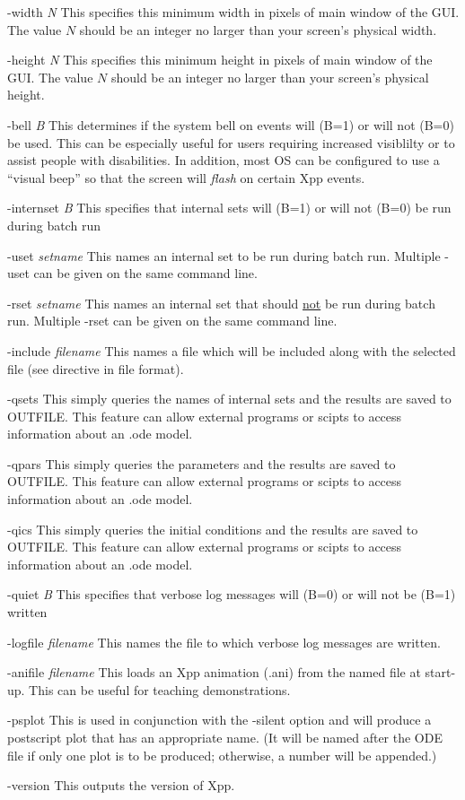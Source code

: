 \begin{description}
\item{-width  \emph{N}} This specifies this minimum width in pixels of main window of the GUI. The value $N$ should be an integer no larger than your screen's physical width.
\item{-height \emph{N}} This specifies this minimum height in pixels of main window of the GUI. The value $N$ should be an integer no larger than your screen's physical height.              
\item{-bell \emph{B}} This determines if the system bell on events will (B=1) or will not (B=0) be used.  This can be especially useful
for users requiring increased visiblilty or to assist people with disabilities.  In addition, most OS can be configured to use a ``visual beep''
so that the screen will \emph{flash} on certain Xpp events. 
\item{-internset \emph{B}} This specifies that internal sets will (B=1) or will not (B=0) be run during batch run
\item{-uset \emph{setname}}  This names an internal set to be run during batch run.  Multiple -uset can be given on the same command line.
\item{-rset \emph{setname}} This names an internal set that should \underline{not} be run during batch run. Multiple -rset can be given on the same command line.
\item{-include \emph{filename}} This names a file which will be included along with the selected {} file (see {} directive in {} file format).
\item{-qsets} This simply queries the names of internal sets and the results are saved to OUTFILE.  This feature can allow 
external programs or scipts to access information about an .ode model. 
\item{-qpars} This simply queries the  parameters and the results are saved to OUTFILE.  This feature can allow 
external programs or scipts to access information about an .ode model.
\item{-qics} This simply queries the initial conditions and the results are saved to OUTFILE.  This feature can allow 
external programs or scipts to access information about an .ode model.          
 \item{-quiet \emph{B}}  This specifies that verbose log messages will (B=0) or will not be (B=1) written
\item{-logfile \emph{filename}} This names the file to which verbose log messages are written. 
\item{-anifile \emph{filename}} This loads an Xpp animation (.ani) from the named file at start-up.  This can be useful for
teaching demonstrations.
\item{-psplot} This is used in conjunction with the -silent option and will produce a postscript plot that has an appropriate name. (It will be named after the ODE file if only one plot is to be produced; otherwise, a number will be appended.)
\item{-version} This outputs the version of Xpp.
\end{description}
